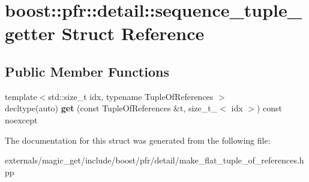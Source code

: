 \hypertarget{structboost_1_1pfr_1_1detail_1_1sequence__tuple__getter}{}\section{boost\+:\+:pfr\+:\+:detail\+:\+:sequence\+\_\+tuple\+\_\+getter Struct Reference}
\label{structboost_1_1pfr_1_1detail_1_1sequence__tuple__getter}
\subsection*{Public Member Functions}
\begin{DoxyCompactItemize}
\item 
\mbox{\label{structboost_1_1pfr_1_1detail_1_1sequence__tuple__getter_a26ef66e927e279f07c1fb47037330725}} 
{\footnotesize template$<$std\+::size\+\_\+t idx, typename Tuple\+Of\+References $>$ }\\decltype(auto) {\bfseries get} (const Tuple\+Of\+References \&t, size\+\_\+t\+\_\+$<$ idx $>$) const noexcept
\end{DoxyCompactItemize}


The documentation for this struct was generated from the following file\+:\begin{DoxyCompactItemize}
\item 
externals/magic\+\_\+get/include/boost/pfr/detail/make\+\_\+flat\+\_\+tuple\+\_\+of\+\_\+references.\+hpp\end{DoxyCompactItemize}
